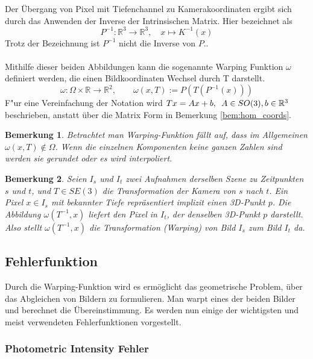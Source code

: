 \documentclass[12pt,DIV=15,BCOR=15mm,twoside,headsepline,abstract=true,listof=totoc,bibliography=totoc]{scrreprt}
\newtheorem{remark}{Bemerkung}[chapter]
\theoremstyle{remark}    %
\begin{document}
    Der Übergang von Pixel mit Tiefenchannel zu Kamerakoordinaten ergibt sich durch das Anwenden der Inverse der Intrinsischen Matrix. Hier bezeichnet als
    \[ P^{-1}: \mathbb{R}^3 \to \mathbb{R}^3, \hspace{1em} x \mapsto K^{-1}(x)\] 
    Trotz der Bezeichnung ist $P^{-1}$ nicht die Inverse von $P$.\cite{djema2023densevisualodometryusing}.\\\\
    Mithilfe dieser beiden Abbildungen kann die sogenannte  Warping Funktion $\omega$ definiert werden, die einen Bildkoordinaten Wechsel
    durch T darstellt.
    \[
        \omega: \Omega \times \mathbb{R} \to \mathbb{R}^2, \hspace{2em} \omega (x,T) := P(T(P^{-1}(x)))
    \]
    F"ur eine Vereinfachung der Notation wird $Tx = Ax + b, \hspace{0.5em} A \in SO(3), b \in \mathbb{R}^3$ beschrieben, anstatt über die 
    Matrix Form in Bemerkung \ref{bem:hom_coords}.
    \begin{remark}
        Betrachtet man Warping-Funktion fällt auf, dass im Allgemeinen $\omega(x,T) \notin \Omega$.
        Wenn die einzelnen Komponenten keine ganzen Zahlen sind werden sie gerundet oder es wird interpoliert.
    \end{remark}
    \begin{remark}
        Seien $I_s$ und $I_t$ zwei Aufnahmen derselben Szene zu Zeitpunkten $s$ und $t$, 
        und $T \in SE(3)$ die Transformation der Kamera von $s$ nach $t$. Ein Pixel $x \in I_s$ mit bekannter Tiefe repräsentiert implizit einen 3D-Punkt $p$. 
        Die Abbildung $\omega(T^{-1}, x)$ liefert den Pixel in $I_t$, der denselben 3D-Punkt $p$ darstellt. \\
        Also stellt $\omega(T^{-1}, x)$ die Transformation (Warping) von Bild $I_s$ zum Bild $I_t$ da.
    \end{remark}
    
    \subsection{Fehlerfunktion}
    \label{Fehlerfunktion}
    Durch die Warping-Funktion wird es ermöglicht das geometrische Problem, über das Abgleichen von Bildern zu formulieren. Man warpt eines 
    der beiden Bilder und berechnet die Übereinstimmung.
    Es werden nun einige der wichtigsten und meist verwendeten Fehlerfunktionen vorgestellt. 

    \subsubsection{Photometric Intensity Fehler}
    
\end{document}
